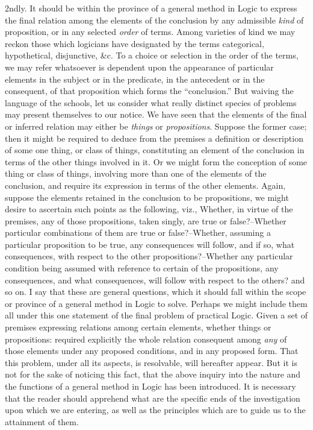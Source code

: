 \documentclass[oneside]{book}
\begin{document}
2ndly. It should be within the province of a general method
in Logic to express the final relation among the elements of the
conclusion by any admissible \textit{kind} of proposition, or in any selected
\textit{order} of terms. Among varieties of kind we may reckon
those which logicians have designated by the terms categorical,
hypothetical, disjunctive, \&c. To a choice or selection in the
order of the terms, we may refer whatsoever is dependent upon
the appearance of particular elements in the subject or in the
predicate, in the antecedent or in the consequent, of that proposition
which forms the ``conclusion.'' But waiving the language
of the schools, let us consider what really distinct species of
problems may present themselves to our notice. We have seen
that the elements of the final or inferred relation may either be
\textit{things} or \textit{propositions}. Suppose the former case; then it might
be required to deduce from the premises a definition or description
of some one thing, or class of things, constituting an element of
the conclusion in terms of the other things involved in it. Or
we might form the conception of some thing or class of things,
involving more than one of the elements of the conclusion, and
require its expression in terms of the other elements. Again,
suppose the elements retained in the conclusion to be propositions,
we might desire to ascertain such points as the following,
viz., Whether, in virtue of the premises, any of those propositions,
taken singly, are true or false?--Whether particular
combinations of them are true or false?--Whether, assuming a
particular proposition to be true, any consequences will follow,
and if so, what consequences, with respect to the other
propositions?--Whether any particular condition being assumed with
reference to certain of the propositions, any consequences, and
what consequences, will follow with respect to the others? and
so on. I say that these are general questions, which it should
fall within the scope or province of a general method in Logic to
solve. Perhaps we might include them all under this one statement
of the final problem of practical Logic. Given a set of
premises expressing relations among certain elements, whether
things or propositions: required explicitly the whole relation
consequent among \textit{any} of those elements under any proposed
conditions, and in any proposed form. That this problem, under
all its aspects, is resolvable, will hereafter appear. But it is not
for the sake of noticing this fact, that the above inquiry into the
nature and the functions of a general method in Logic has been
introduced. It is necessary that the reader should apprehend
what are the specific ends of the investigation upon which we
are entering, as well as the principles which are to guide us to
the attainment of them.
\end{document}
